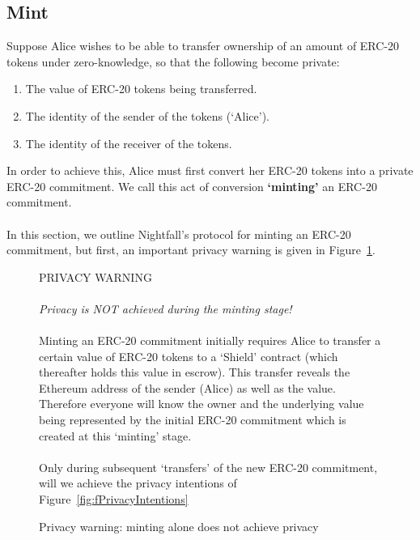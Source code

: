 \subsection{Mint}
\label{sec:20Mint}

Suppose Alice wishes to be able to transfer ownership of an amount of ERC-20 tokens under zero-knowledge, so that the following become private:
	\begin{center}
		\begin{framed}
      \begin{enumerate}
        \item The value of ERC-20 tokens being transferred.
        \item The identity of the sender of the tokens (`Alice').
        \item The identity of the receiver of the tokens.
      \end{enumerate}
    \end{framed}
  \end{center}
In order to achieve this, Alice must first convert her ERC-20 tokens into a private ERC-20 commitment. We call this act of conversion \textbf{`minting'} an ERC-20 commitment.\\
\\
In this section, we outline Nightfall's protocol for minting an ERC-20 commitment, but first, an important privacy warning is given in Figure~\ref{fig:fMintWarning}.

\begin{figure}[h]
  \begin{center}
    \begin{mdframed}[backgroundcolor=verylightred]
      \noindent
      PRIVACY WARNING\\
      \\
      \textit{
      Privacy is NOT achieved during the minting stage!
      }\\
      \\
      Minting an ERC-20 commitment initially requires Alice to transfer a certain value of ERC-20 tokens to a `Shield' contract (which thereafter holds this value in escrow). This transfer reveals the Ethereum address of the sender (Alice) as well as the value. Therefore everyone will know the owner and the underlying value being represented by the initial ERC-20 commitment which is created at this `minting' stage.\\
      \\
      Only during subsequent `transfers' of the new ERC-20 commitment, will we achieve the privacy intentions of Figure~\ref{fig:fPrivacyIntentions}
    \end{mdframed}
  \end{center}
  \caption{Privacy warning: minting alone does not achieve privacy}
  \label{fig:fMintWarning}
\end{figure}

